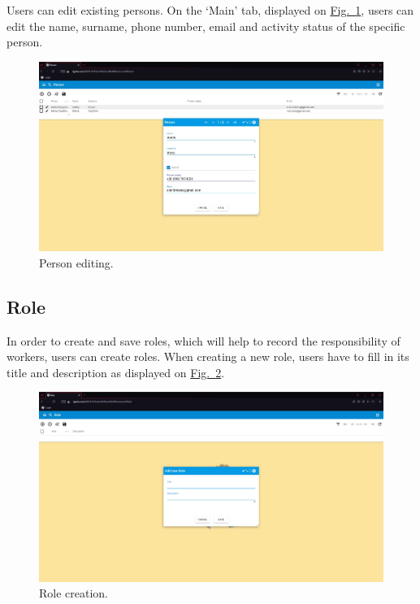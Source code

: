 \newpage
Users can edit existing persons. On the ‘Main’ tab, displayed on \hyperref[sections/personnel/images/fig3]{Fig.~\ref*{sections/personnel/images/fig3}}, users can edit the name, surname, phone number, email and activity status of the specific person.

\begin{figure}[!htbp]
\centering
\includegraphics[width=0.95\linewidth]{sections/personnel/images/fig3.jpg}
\caption{Person editing.}\label{sections/personnel/images/fig3}
\end{figure}

\newpage
\subsection{Role}

In order to create and save roles, which will help to record the responsibility of workers, users can create roles. When creating a new role, users have to fill in its title and description as displayed on
\hyperref[sections/personnel/images/fig5]{Fig.~\ref*{sections/personnel/images/fig5}}.

\begin{figure}[!htbp]
\centering
\includegraphics[width=0.95\linewidth]{sections/personnel/images/fig5.jpg}
\caption{Role creation.}\label{sections/personnel/images/fig5}
\end{figure}

